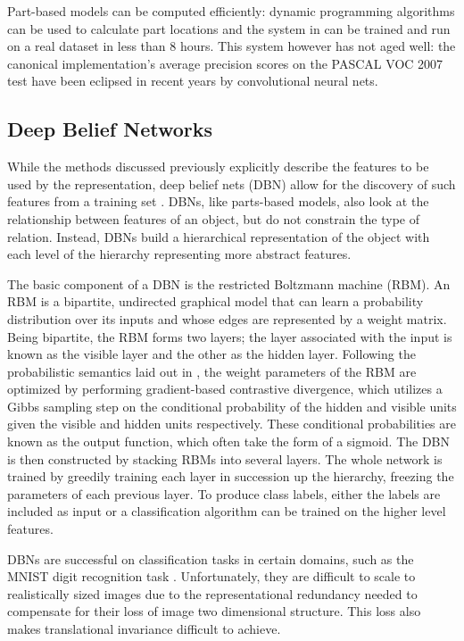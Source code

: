 \documentclass[10pt,twocolumn,letterpaper]{article}
\begin{document}
Part-based models can be computed efficiently: dynamic programming algorithms
can be used to calculate part locations and the system in \cite{PartModels} can be trained
and run on a real dataset in less than 8 hours.
This system however has not aged well: the canonical implementation's average precision
scores on the PASCAL VOC 2007 \cite{PascalVOC} test have been eclipsed in recent years
by convolutional neural nets.

\subsection{Deep Belief Networks}

While the methods discussed previously explicitly describe the features to be used
by the representation, deep belief nets (DBN) allow for the discovery of such features
from a training set \cite{HintonDBN} \cite{CDBN}.
DBNs, like parts-based models, also look at the relationship between features of an object,
but do not constrain the type of relation.
Instead, DBNs build a hierarchical representation of the object with each level of the hierarchy
representing more abstract features.

The basic component of a DBN is the restricted Boltzmann machine (RBM).
An RBM is a bipartite, undirected graphical model that can learn a probability distribution
over its inputs and whose edges are represented by a weight matrix.
Being bipartite, the RBM forms two layers; the layer associated with the input is known
as the visible layer and the other as the hidden layer.
Following the probabilistic semantics laid out in \cite{CDBN}, the weight parameters of the RBM
are optimized by performing gradient-based contrastive divergence, which utilizes a
Gibbs sampling step on the conditional probability of the hidden and visible units given
the visible and hidden units respectively.
These conditional probabilities are known as the output function, which often take the form of a sigmoid.
The DBN is then constructed by stacking RBMs into several layers.
The whole network is trained by greedily training each layer in succession up the hierarchy,
freezing the parameters of each previous layer.
To produce class labels, either the labels are included as input or a classification algorithm
can be trained on the higher level features.

DBNs are successful on classification tasks in certain domains, such as the MNIST digit recognition
task \cite{HintonDBN}. Unfortunately, they are difficult to scale to realistically sized images
due to the representational redundancy needed to compensate for their loss of image
two dimensional structure. This loss also makes translational invariance difficult to achieve.
\end{document}
